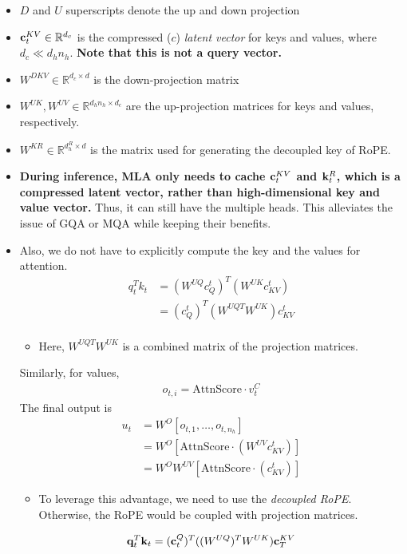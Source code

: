 \begin{itemize}
	\item $D$ and $U$ superscripts denote the up and down projection
	\item ${\mathbf{c}}_t^{KV}\in \mathbb{R}^{d_c}$ is the compressed (\ie $c$) \textit{latent vector} for keys and values, where $d_c\ll d_hn_h$. \textbf{Note that this is not a query vector.}
	\item $W^{DKV}\in \mathbb{R}^{d_c\times d}$ is the down-projection matrix
	\item $W^{UK},W^{UV}\in \mathbb{R}^{d_hn_h\times d_c}$ are the up-projection matrices for keys and values, respectively.
	\item $W^{KR}\in \mathbb{R}^{d_h^R\times d}$ is the matrix used for generating the decoupled key of RoPE. 
	\item \textbf{During inference, MLA only needs to cache ${\mathbf{c}}_t^{KV}$ and ${\mathbf{k}}_t^{R}$, which is a compressed latent vector, rather than high-dimensional key and value vector.} Thus, it can still have the multiple heads. This alleviates the issue of GQA or MQA while keeping their benefits. 
	\item Also, we do not have to explicitly compute the key and the values for attention.
		\begin{align*}
			q_t^Tk_t &= (W^{UQ}c_Q^t)^T(W^{UK}c_{KV}^t)\\
					 &= (c_Q^t)^T(W^{UQT}W^{UK})c_{KV}^t\\
		\end{align*}
		\begin{itemize}
			\item Here, $W^{UQT}W^{UK}$ is a combined matrix of the projection matrices.
		\end{itemize}
		Similarly, for values,
		\begin{align*}
			o_{t,i} = \text{AttnScore}\cdot v_t^C
		\end{align*}
		The final output is
		\begin{align*}
			u_t &= W^O[o_{t,1}, \dots, o_{t,n_h}]\\
				&= W^O[\text{AttnScore}\cdot (W^{UV}c_{KV}^t)]\\
				&= W^OW^{UV}[\text{AttnScore}\cdot (c_{KV}^t)]
		\end{align*}
		\begin{itemize}
			\item To leverage this advantage, we need to use the \textit{decoupled RoPE}. Otherwise, the RoPE would be coupled with projection matrices.
		\end{itemize}
		\begin{align*}
			{\mathbf{q}}_t^T{\mathbf{k}}_t = ({\mathbf{c}}_t^Q)^T((W^{UQ})^TW^{UK}){\mathbf{c}}_T^{KV}
		\end{align*}
\end{itemize}

